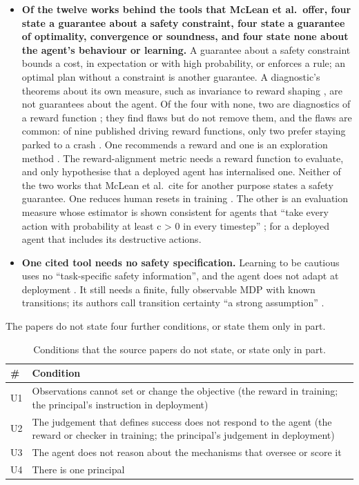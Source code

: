 \documentclass{article}
\begin{document}
\begin{itemize}
\item
  \textbf{Of the twelve works behind the tools that McLean et al.~offer, four state a guarantee about a safety constraint, four state a guarantee of optimality, convergence or soundness, and four state none about the agent's behaviour or learning.} A guarantee about a safety constraint bounds a cost, in expectation or with high probability, or enforces a rule; an optimal plan without a constraint is another guarantee. A diagnostic's theorems about its own measure, such as invariance to reward shaping \citep{muslimani2025}, are not guarantees about the agent. Of the four with none, two are diagnostics of a reward function \citep{muslimani2025, knox2023}; they find flaws but do not remove them, and the flaws are common: of nine published driving reward functions, only two prefer staying parked to a crash \citep{knox2023}. One recommends a reward \citep{vasan2024} and one is an exploration method \citep{klissarov2023}. The reward-alignment metric needs a reward function to evaluate, and \citet[§4]{mclean2026} only hypothesise that a deployed agent has internalised one. Neither of the two works that McLean et al.~cite for another purpose states a safety guarantee. One reduces human resets in training \citep{lee2025}. The other is an evaluation measure whose estimator is shown consistent for agents that ``take every action with probability at least c \textgreater{} 0 in every timestep'' \citep[Theorem 1]{elelimy2025}; for a deployed agent that includes its destructive actions.
\item
  \textbf{One cited tool needs no safety specification.} Learning to be cautious uses no ``task-specific safety information'', and the agent does not adapt at deployment \citep{mohammedalamen2025a}. It still needs a finite, fully observable MDP with known transitions; its authors call transition certainty ``a strong assumption'' \citep{mohammedalamen2025a}.
\end{itemize}

The papers do not state four further conditions, or state them only in part.

\begin{table}[!htb]
\centering\small\setlength{\tabcolsep}{3pt}
\caption{Conditions that the source papers do not state, or state only in part.}\label{tab:unstated}
\begin{tabularx}{\textwidth}{@{}l>{\raggedright\arraybackslash}X@{}}
\toprule
\# & Condition \\
\midrule
U1 & Observations cannot set or change the objective (the reward in training; the principal's instruction in deployment) \\
U2 & The judgement that defines success does not respond to the agent (the reward or checker in training; the principal's judgement in deployment) \\
U3 & The agent does not reason about the mechanisms that oversee or score it \\
U4 & There is one principal \\
\bottomrule
\end{tabularx}
\end{table}
\end{document}
